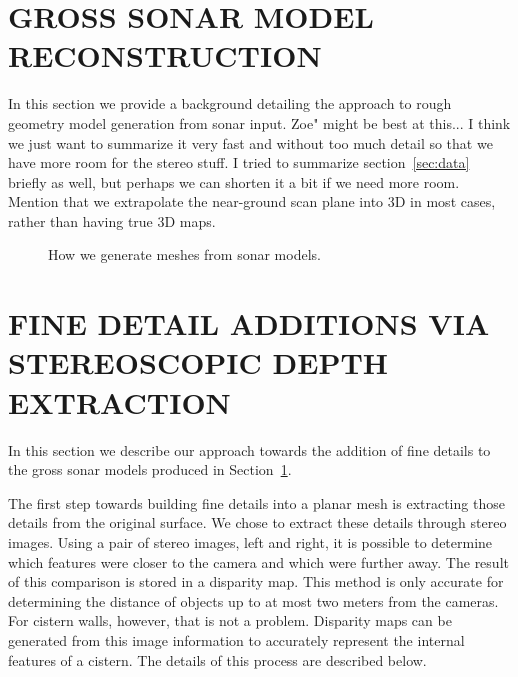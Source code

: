 \documentclass[a4paper,twoside]{article}
\begin{document}
\section{\uppercase{Gross sonar Model Reconstruction}}
\label{sec:reconstruction}




\noindent In this section we provide a background detailing the approach to rough geometry model generation from sonar input. Zoe" might be best at this... I think we just want to summarize it very fast and without too much detail so that we have more room for the stereo stuff. I tried to summarize section~\ref{sec:data} briefly as well, but perhaps we can shorten it a bit if we need more room. Mention that we extrapolate the near-ground scan plane into 3D in most cases, rather than having true 3D maps.

\begin{figure*}[!ht]
   \vspace{-0.2cm}
   \caption{How we generate meshes from sonar models.}
  \label{fig:meshgen}
 \end{figure*}

\section{\uppercase{Fine Detail Additions Via Stereoscopic Depth Extraction}}
\label{sec:detail}

\noindent In this section we describe our approach towards the addition of fine details to the gross sonar models produced in Section~\ref{sec:reconstruction}. 

The first step towards building fine details into a planar mesh is extracting those details from the original surface. 
We chose to extract these details through stereo images.  
Using a pair of stereo images, left and right, it is possible to determine which features were closer to the camera and which were further away.  
The result of this comparison is stored in a disparity map.  
This method is only accurate for determining the distance of objects up to at most two meters from the cameras.  
For cistern walls, however, that is not a problem.  
Disparity maps can be generated from this image information to accurately represent the internal features of a cistern. 
The details of this process are described below.
\end{document}
